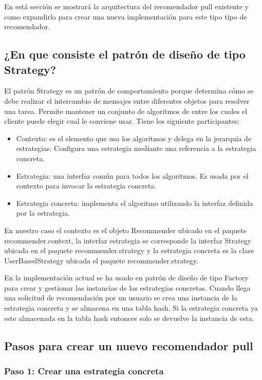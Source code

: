 En está sección se mostrará la arquitectura del recomendador pull existente y como expandirlo para crear una nueva implementación para este tipo tipo de recomendador. 

\subsection{¿En que consiste el patrón de diseño de tipo Strategy?}

El patrón Strategy es un patrón de comportamiento porque determina cómo se debe realizar el intercambio de mensajes entre diferentes objetos para resolver una tarea. Permite mantener un conjunto de algoritmos de entre los cuales el cliente puede elegir cual le conviene usar. Tiene los siguiente participantes:

\begin{itemize}
	\item Contexto: es el elemento que usa los algoritmos y delega en la jerarquía de estrategias. Configura una estrategia mediante una referencia a la estrategia concreta.  
	\item Estrategia: una interfaz común para todos los algoritmos. Es usada por el contexto para invocar la estrategia concreta.
	\item Estrategia concreta: implementa el algoritmo utilizando la interfaz definida por la estrategia.
\end{itemize}

En nuestro caso el contexto es el objeto Recommender ubicado en el paquete recommender.context, la interfaz estrategia se corresponde la interfaz Strategy ubicada en el paquete recommender.strategy y la estrategia concreta es la clase UserBasedStrategy ubicada el paquete recommender.strategy. 

En la implementación actual se ha usado en patrón de diseño de tipo Factory para crear y gestionar las instancias de las estrategias concretas. Cuando llega una solicitud de recomendación por un usuario se crea una instancia de la estrategia concreta y se almacena en una tabla hash. Si la estrategia concreta ya este almacenada en la tabla hash entonces solo se devuelve la instancia de esta.

\subsection{Pasos para crear un nuevo recomendador pull}

\subsubsection{Paso 1: Crear una estrategia concreta}

